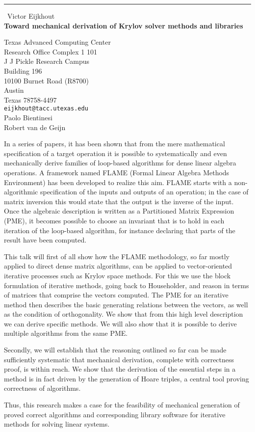 \documentclass{report}
\begin{document}
\begin{center}
\rule{6in}{1pt} \
{\large Victor Eijkhout \\
{\bf Toward mechanical derivation of Krylov solver methods and libraries}}

Texas Advanced Computing Center \\ Research Office Complex 1 101 \\ J J Pickle Research Campus \\ Building 196 \\ 10100 Burnet Road (R8700) \\ Austin \\ Texas 78758-4497
\\
{\tt eijkhout@tacc.utexas.edu}\\
Paolo Bientinesi\\
Robert van de Geijn\end{center}

In a series of papers, it has been shown that from the mere
mathematical specification of a target operation it is possible to
systematically and even mechanically derive families of loop-based
algorithms for dense linear algebra operations. A framework named
FLAME (Formal Linear Algebra Methods Environment) has been developed
to realize this aim. FLAME starts with a non-algorithmic specification
of the inputs and outputs of an operation; in the case of matrix
inversion this would state that the output is the inverse of the
input. Once the algebraic description is written as a Partitioned
Matrix Expression (PME), it becomes possible to choose an invariant
that is to hold in each iteration of the loop-based algorithm, for
instance declaring that parts of the result have been computed.

This talk will first of all show how the FLAME methodology, so far mostly
applied to direct dense matrix algorithms, can be applied to
vector-oriented iterative processes such as Krylov space methods. For
this we use the block formulation of iterative methods, going back to
Householder, and reason in terms of matrices that comprise the vectors
computed. The PME for an iterative method then describes the basic
generating relations between the vectors, as well as the condition of
orthogonality. We show that from this high level description we
can derive specific methods. We will also show that it is possible to
derive multiple algorithms from the same PME.

Secondly, we will establish that the reasoning outlined so far
can be made sufficiently
systematic that mechanical derivation, complete with correctness
proof, is within reach. We show that the derivation of the essential
steps in a method is in fact driven by the generation of Hoare
triples, a central tool proving correctness of algorithms.

Thus, this research makes a case for the feasibility of
mechanical generation of proved correct algorithms and corresponding
library software for iterative methods for solving linear systems.
\end{document}

